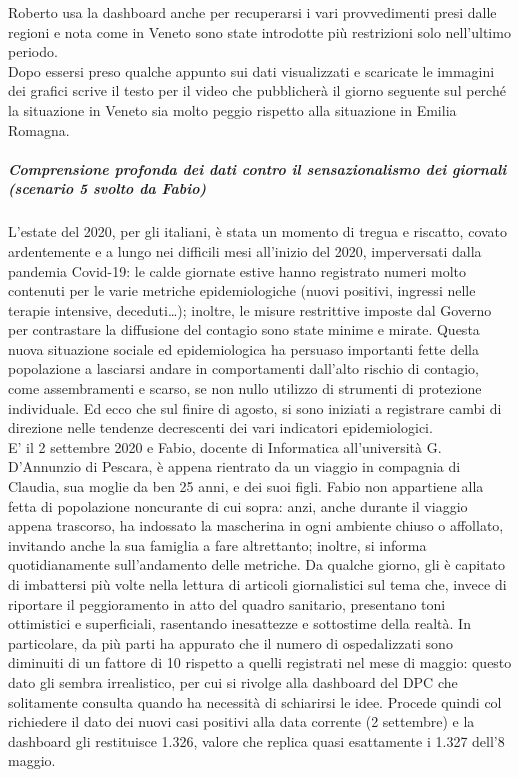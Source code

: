 Roberto usa la dashboard anche per recuperarsi i vari provvedimenti presi dalle regioni e nota come in Veneto sono state introdotte più restrizioni solo nell'ultimo periodo. \\
Dopo essersi preso qualche appunto sui dati visualizzati e scaricate le immagini dei grafici scrive il testo per il video che pubblicherà il giorno seguente sul perché la situazione in Veneto sia molto peggio rispetto alla situazione in Emilia Romagna.
\noindent
\subparagraph{Comprensione profonda dei dati contro il sensazionalismo dei giornali (scenario 5 svolto da Fabio)}
L'estate del 2020, per gli italiani, è stata un momento di tregua e riscatto, covato ardentemente e a lungo nei difficili mesi all'inizio del 2020, imperversati dalla pandemia Covid-19: le calde giornate estive hanno registrato numeri molto contenuti per le varie metriche epidemiologiche (nuovi positivi, ingressi nelle terapie intensive, deceduti…); inoltre, le misure restrittive imposte dal Governo per contrastare la diffusione del contagio sono state minime e mirate.
Questa nuova situazione sociale ed epidemiologica ha persuaso importanti fette della popolazione a lasciarsi andare in comportamenti dall'alto rischio di contagio, come assembramenti e scarso, se non nullo utilizzo di strumenti di protezione individuale.
Ed ecco che sul finire di agosto, si sono iniziati a registrare cambi di direzione nelle tendenze decrescenti dei vari indicatori epidemiologici.\\
E' il 2 settembre 2020 e Fabio, docente di Informatica all'università G. D'Annunzio di Pescara, è appena rientrato da un viaggio in compagnia di Claudia, sua moglie da ben 25 anni, e dei suoi figli.
Fabio non appartiene alla fetta di popolazione noncurante di cui sopra: anzi, anche durante il viaggio appena trascorso, ha indossato la mascherina in ogni ambiente chiuso o affollato, invitando anche la sua famiglia a fare altrettanto; inoltre, si informa quotidianamente sull'andamento delle metriche.
Da qualche giorno, gli è capitato di imbattersi più volte nella lettura di articoli giornalistici sul tema che, invece di riportare il peggioramento in atto del quadro sanitario, presentano toni ottimistici e superficiali, rasentando inesattezze e sottostime della realtà.
In particolare, da più parti ha appurato che il numero di ospedalizzati sono diminuiti di un fattore di 10 rispetto a quelli registrati nel mese di maggio: questo dato gli sembra irrealistico, per cui si rivolge alla dashboard del DPC che solitamente consulta quando ha necessità di schiarirsi le idee.
Procede quindi col richiedere il dato dei nuovi casi positivi alla data corrente (2 settembre) e la dashboard gli restituisce 1.326, valore che replica quasi esattamente i 1.327 dell'8 maggio.
